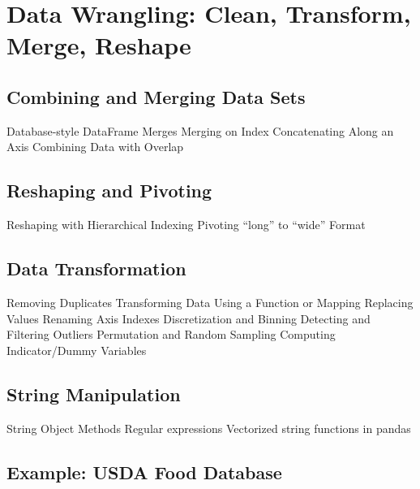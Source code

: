 
\section{Data Wrangling: Clean, Transform, Merge, Reshape}
\subsection{Combining and Merging Data Sets}
Database-style DataFrame Merges
Merging on Index
Concatenating Along an Axis
Combining Data with Overlap
\subsection{Reshaping and Pivoting}
Reshaping with Hierarchical Indexing
Pivoting “long” to “wide” Format
\subsection{Data Transformation}
Removing Duplicates
Transforming Data Using a Function or Mapping
Replacing Values
Renaming Axis Indexes
Discretization and Binning
Detecting and Filtering Outliers
Permutation and Random Sampling
Computing Indicator/Dummy Variables
\subsection{String Manipulation}
String Object Methods
Regular expressions
Vectorized string functions in pandas
\subsection{Example: USDA Food Database}
